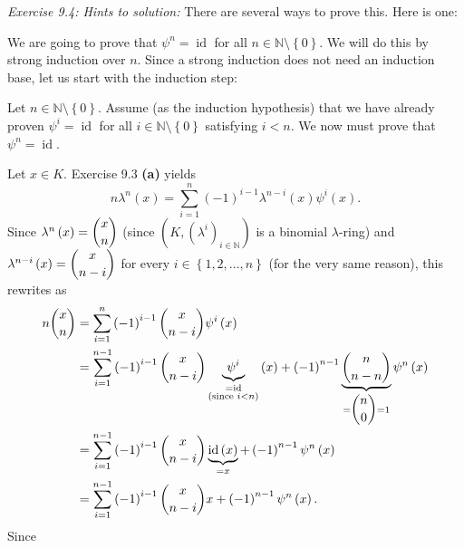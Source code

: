 \documentclass[numbers=enddot,12pt,final,onecolumn,notitlepage]{scrartcl}%
\begin{document}
\textit{Exercise 9.4: Hints to solution:} There are several ways to prove
this. Here is one:

We are going to prove that $\psi^{n}=\operatorname*{id}$ for all
$n\in\mathbb{N}\setminus\left\{  0\right\}  $. We will do this by strong
induction over $n$. Since a strong induction does not need an induction base,
let us start with the induction step:

Let $n\in\mathbb{N}\setminus\left\{  0\right\}  $. Assume (as the induction
hypothesis) that we have already proven $\psi^{i}=\operatorname*{id}$ for all
$i\in\mathbb{N}\setminus\left\{  0\right\}  $ satisfying $i<n$. We now must
prove that $\psi^{n}=\operatorname*{id}$.

Let $x\in K$. Exercise 9.3 \textbf{(a)} yields%
\[
n\lambda^{n}\left(  x\right)  =\sum_{i=1}^{n}\left(  -1\right)  ^{i-1}%
\lambda^{n-i}\left(  x\right)  \psi^{i}\left(  x\right)  .
\]
Since $\lambda^{n}\left(  x\right)  =\dbinom{x}{n}$ (since $\left(  K,\left(
\lambda^{i}\right)  _{i\in\mathbb{N}}\right)  $ is a binomial $\lambda$-ring)
and $\lambda^{n-i}\left(  x\right)  =\dbinom{x}{n-i}$ for every $i\in\left\{
1,2,...,n\right\}  $ (for the very same reason), this rewrites as%
\begin{align*}
n\dbinom{x}{n}  &  =\sum_{i=1}^{n}\left(  -1\right)  ^{i-1}\dbinom{x}{n-i}%
\psi^{i}\left(  x\right) \\
&  =\sum_{i=1}^{n-1}\left(  -1\right)  ^{i-1}\dbinom{x}{n-i}\underbrace{\psi
^{i}}_{\substack{=\operatorname*{id}\\\text{(since }i<n\text{)}}}\left(
x\right)  +\left(  -1\right)  ^{n-1}\underbrace{\dbinom{n}{n-n}}_{=\dbinom
{n}{0}=1}\psi^{n}\left(  x\right) \\
&  =\sum_{i=1}^{n-1}\left(  -1\right)  ^{i-1}\dbinom{x}{n-i}%
\underbrace{\operatorname*{id}\left(  x\right)  }_{=x}+\left(  -1\right)
^{n-1}\psi^{n}\left(  x\right) \\
&  =\sum_{i=1}^{n-1}\left(  -1\right)  ^{i-1}\dbinom{x}{n-i}x+\left(
-1\right)  ^{n-1}\psi^{n}\left(  x\right)  .
\end{align*}
Since%
\end{document}
